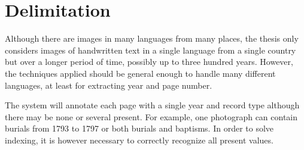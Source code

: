 \section{Delimitation}

Although there are images in many languages from many places, the thesis only considers images of handwritten text in a single language from a single country but over a longer period of time, possibly up to three hundred years.
However, the techniques applied should be general enough to handle many different languages, at least for extracting year and page number.


The system will annotate each page with a single year and record type although there may be none or several present. For example, one photograph can contain burials from 1793 to 1797 or both burials and baptisms. In order to solve indexing, it is however necessary to correctly recognize all present values.
